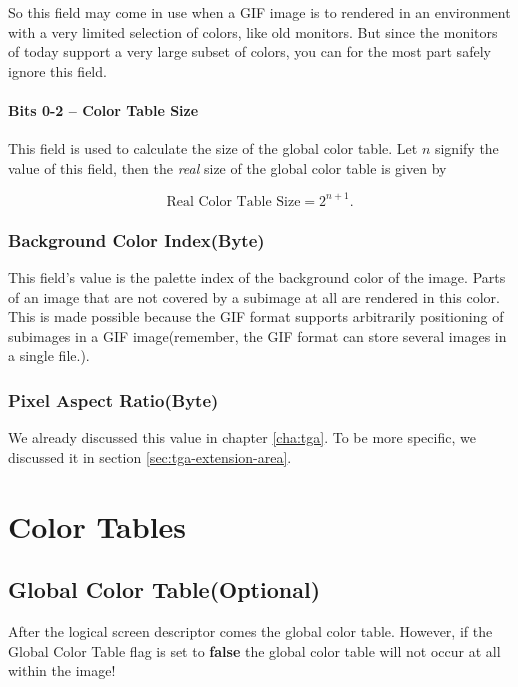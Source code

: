 So this field may come in use when a GIF image is to rendered in an
environment with a very limited selection of colors, like old
monitors.  But since the monitors of today support a very large subset
of colors, you can for the most part safely ignore this field.

\paragraph{Bits 0-2 -- Color Table Size}

This field is used to calculate the size of the global color table.
Let $n$ signify the value of this field, then the \textit{real} size
of the global color table is given by

\begin{equation}
  \label{eq:calc-global-color-table-size}
  \text{Real Color Table Size} = 2^{n + 1}.
\end{equation}

\subsubsection{Background Color Index(Byte)}

This field's value is the palette index of the background color of the
image. Parts of an image that are not covered by a subimage at all are
rendered in this color. This is made possible because the GIF format
supports arbitrarily positioning of subimages in a GIF image(remember,
the GIF format can store several images in a single file.).

\subsubsection{Pixel Aspect Ratio(Byte)}

We already discussed this value in chapter \ref{cha:tga}. To be more
specific, we discussed it in section \ref{sec:tga-extension-area}.

\section{Color Tables}

\subsection{Global Color Table(Optional)}

After the logical screen descriptor comes the global color
table. However, if the Global Color Table flag is set to
\textbf{false} the global color table will not occur at all within
the image!

